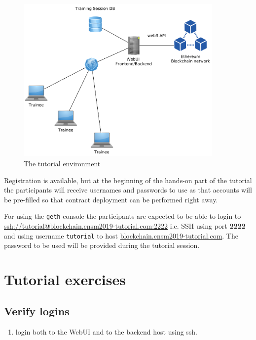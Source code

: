\documentclass[a4paper]{article}
\begin{document}
\begin{figure}[H]
    \centering
    \includegraphics[width=0.9\textwidth]{figures/env.png}
    \caption{The tutorial environment}
    \label{fig:demo-env}
\end{figure}

Registration is available, but at the beginning of the hands-on part of the tutorial the participants will receive usernames and passwords to use as that accounts will be pre-filled so that contract deployment can be performed right away.

For using the \texttt{geth} console the participants are expected to be able to login to \url{ssh://tutorial@blockchain.cnsm2019-tutorial.com:2222} i.e. SSH using port \textbf{2222} and using username \texttt{tutorial} to host \url{blockchain.cnsm2019-tutorial.com}. The password to be used will be provided during the tutorial session.

\section{Tutorial exercises}

\subsection{Verify logins}

\begin{enumerate}[label=\textbf{Task \arabic*}:, series=l_tasks]
\item login both to the WebUI and to the backend host using ssh.
\end{enumerate}
\end{document}
